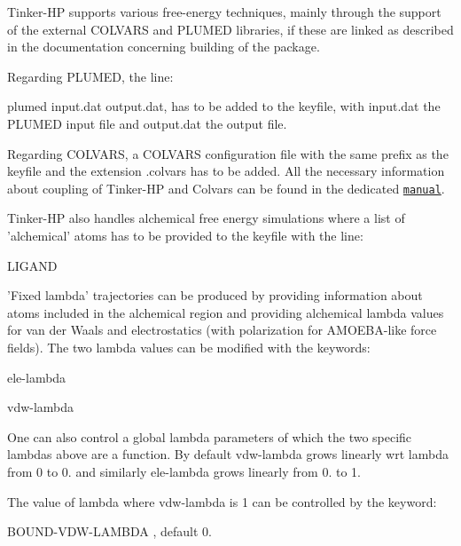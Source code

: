Tinker-\/\-H\-P supports various free-\/energy techniques, mainly through the support of the external C\-O\-L\-V\-A\-R\-S and P\-L\-U\-M\-E\-D libraries, if these are linked as described in the documentation concerning building of the package.

Regarding P\-L\-U\-M\-E\-D, the line\-:
\begin{DoxyItemize}
\item plumed input.\-dat output.\-dat, has to be added to the keyfile, with input.\-dat the P\-L\-U\-M\-E\-D input file and output.\-dat the output file.
\end{DoxyItemize}

Regarding C\-O\-L\-V\-A\-R\-S, a C\-O\-L\-V\-A\-R\-S configuration file with the same prefix as the keyfile and the extension .colvars has to be added. All the necessary information about coupling of Tinker-\/\-H\-P and Colvars can be found in the dedicated \href{http://colvars.github.io/master/colvars-refman-tinkerhp.pdf}{\tt manual}.

Tinker-\/\-H\-P also handles alchemical free energy simulations where a list of 'alchemical' atoms has to be provided to the keyfile with the line\-:
\begin{DoxyItemize}
\item L\-I\-G\-A\-N\-D
\end{DoxyItemize}

'Fixed lambda' trajectories can be produced by providing information about atoms included in the alchemical region and providing alchemical lambda values for van der Waals and electrostatics (with polarization for A\-M\-O\-E\-B\-A-\/like force fields). The two lambda values can be modified with the keywords\-:
\begin{DoxyItemize}
\item ele-\/lambda
\item vdw-\/lambda
\end{DoxyItemize}

One can also control a global lambda parameters of which the two specific lambdas above are a function. By default vdw-\/lambda grows linearly wrt lambda from 0 to 0. and similarly ele-\/lambda grows linearly from 0. to 1.

The value of lambda where vdw-\/lambda is 1 can be controlled by the keyword\-:
\begin{DoxyItemize}
\item B\-O\-U\-N\-D-\/\-V\-D\-W-\/\-L\-A\-M\-B\-D\-A , default 0.
\end{DoxyItemize}

